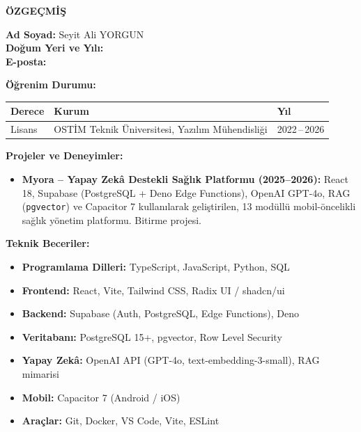 \clearpage
\thispagestyle{empty}

\begin{center}
{\Large \textbf{ÖZGEÇMİŞ}}
\end{center}

\vspace{1cm}

\noindent\textbf{Ad Soyad:} Seyit Ali YORGUN\\[4pt]
\noindent\textbf{Doğum Yeri ve Yılı:} \\[4pt]
\noindent\textbf{E-posta:} \\[4pt]

\vspace{0.8cm}

\noindent\textbf{Öğrenim Durumu:}

\vspace{0.3cm}

\begin{tabular}{@{}lll@{}}
\textbf{Derece} & \textbf{Kurum} & \textbf{Yıl} \\
\hline
Lisans & OSTİM Teknik Üniversitesi, Yazılım Mühendisliği & 2022\,--\,2026 \\
\end{tabular}

\vspace{0.8cm}

\noindent\textbf{Projeler ve Deneyimler:}

\begin{itemize}
  \item \textbf{Myora -- Yapay Zekâ Destekli Sağlık Platformu (2025--2026):}
        React 18, Supabase (PostgreSQL + Deno Edge Functions),
        OpenAI GPT-4o, RAG (\texttt{pgvector}) ve Capacitor 7 kullanılarak
        geliştirilen, 13 modüllü mobil-öncelikli sağlık yönetim platformu.
        Bitirme projesi.
\end{itemize}

\vspace{0.8cm}

\noindent\textbf{Teknik Beceriler:}

\begin{itemize}
  \item \textbf{Programlama Dilleri:} TypeScript, JavaScript, Python, SQL
  \item \textbf{Frontend:} React, Vite, Tailwind CSS, Radix UI / shadcn/ui
  \item \textbf{Backend:} Supabase (Auth, PostgreSQL, Edge Functions), Deno
  \item \textbf{Veritabanı:} PostgreSQL 15+, pgvector, Row Level Security
  \item \textbf{Yapay Zekâ:} OpenAI API (GPT-4o, text-embedding-3-small), RAG mimarisi
  \item \textbf{Mobil:} Capacitor 7 (Android / iOS)
  \item \textbf{Araçlar:} Git, Docker, VS Code, Vite, ESLint
\end{itemize}
